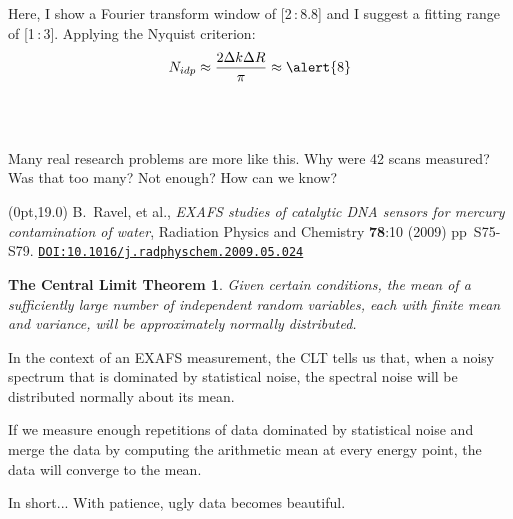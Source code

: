 \documentclass[10pt, xcolor=x11names, compress]{beamer}
\newtheorem{clt}[theorem]{The Central Limit Theorem}
\begin{document}
\begin{frame}
\begin{columns}
\begin{column}{0.5\linewidth}
\begin{center}
      \end{center}
    \end{column}
  \end{columns}
  Here, I show a Fourier transform window of [2\,:\,8.8] and I suggest a
  fitting range of [1\,:\,3].  Applying the Nyquist criterion:
  \begin{equation}
    \notag N_{idp} \approx \frac{2\Delta k\Delta R}{\pi} \approx \alert{8}
  \end{equation}

  ~\\[-7ex]
  ~

  \begin{exampleblock}{}
    \begin{center}
      Many real research problems are more like this.  Why were 42
      scans measured?  Was that too many?  Not enough?  How can we know?
    \end{center}
  \end{exampleblock}

  \begin{textblock*}{0.7\linewidth}(0pt,19.0\TPVertModule)%
    \tiny%
    B.\ Ravel, et al., \textit{EXAFS studies of catalytic DNA sensors
      for mercury contamination of water}, Radiation Physics and
    Chemistry \textbf{78}:10 (2009) pp\ S75-S79.
    \href{http://dx.doi.org/10.1016/j.radphyschem.2009.05.024}
    {\color{Blue4}\texttt{DOI:10.1016/j.radphyschem.2009.05.024}}
  \end{textblock*}
\end{frame}


\begin{frame}
  \begin{clt}
    Given certain conditions, the mean of a sufficiently large number
    of independent random variables, each with finite mean and
    variance, will be approximately normally distributed.
  \end{clt}

  \bigskip

  In the context of an EXAFS measurement, the CLT tells us that, when a
  noisy spectrum that is dominated by statistical noise, the spectral
  noise will be distributed normally about its mean.

  \bigskip

  If we measure enough repetitions of data dominated by statistical
  noise and merge the data by computing the arithmetic mean at every
  energy point, the data will converge to the mean.

  \begin{block}{In short...}
    With patience, ugly data becomes beautiful.
  \end{block}
\end{frame}
\end{document}
